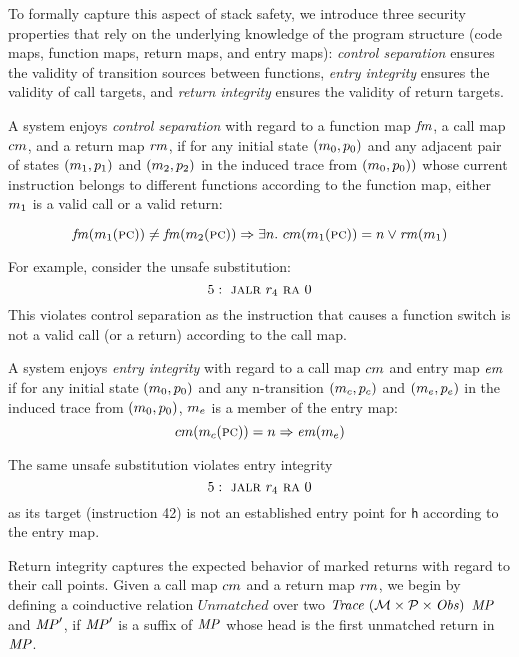\documentclass[acmsmall,review,anonymous]{acmart}\settopmatter{printfolios=true,printccs=false,printacmref=false}
\begin{document}
To formally capture this aspect of stack safety, we introduce three
security properties that rely on the underlying knowledge of the
program structure (code maps, function maps, return maps, and entry
maps): {\em control separation} ensures the validity of transition
sources between functions, {\em entry integrity} ensures the validity
of call targets, and {\em return integrity} ensures the validity of
return targets.


A system enjoys {\em control separation} with regard to a function map
\(\mathit{fm}\), a call map \(cm\), and a return map \(\mathit{rm}\),
if for any initial state \((m_0, p_0)\) and any adjacent pair
of states \((m_1,p_1)\) and \((m_2,p_2)\) in the induced
trace from \((m_0,p_0))\) whose current instruction
belongs to different functions according to the function map,
either $m_1$ is a valid call or a valid return:

\[ \mathit{fm}(m_1(\textsc{pc})) \not = \mathit{fm}(m_2(\textsc{pc})) \Rightarrow
\exists n. ~ cm(m_1(\textsc{pc})) = n \vee
\mathit{rm}(m_1) \]

For example, consider the unsafe substitution:
\[
5 : ~ \textsc{jalr} ~ r_4 ~ \textsc{ra} ~ 0
\]
This violates control separation as the instruction that causes a
function switch is not a valid call (or a return) according to the
call map.


A system enjoys {\em entry integrity} with regard to a call map
\(cm\) and entry map \(\mathit{em}\) if for any initial state
\((m_0, p_0)\) and any n-transition \((m_c,p_c)\) and
\((m_e, p_e)\) in the induced trace from
\((m_0,p_0)\), $m_e$ is a member of the entry map:
\[cm(m_c(\textsc{pc})) = n \Rightarrow \mathit{em}(m_e)\]

The same unsafe substitution violates entry integrity
\[
5 : ~ \textsc{jalr} ~ r_4 ~ \textsc{ra} ~ 0
\]
as its target (instruction 42) is not an established entry point for
{\tt h} according to the entry map.



\newcommand*{\Unmatched}{\mathit{Unmatched}}

Return integrity captures the expected behavior of marked returns with
regard to their call points. Given a call map $cm$ and a return
map $\mathit{rm}$, we begin by defining a coinductive relation
$\Unmatched$ over two $\mathit{Trace}~({\mathcal M} \times \mathcal{P} \times \mathit{Obs})$ $\mathit{MP}$ and $\mathit{MP}'$, if $\mathit{MP}'$ is a
suffix of $\mathit{MP}$ whose head is the first unmatched return in $\mathit{MP}$.
\end{document}
